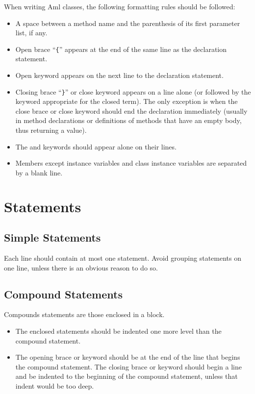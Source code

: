 When writing Aml classes, the following formatting rules should be followed: 
\begin{itemize}
  \item A space between a method name and the parenthesis of its first parameter list, if any. 
  \item Open brace ``\lstinline!{!'' appears at the end of the same line as the declaration statement. 
  \item Open keyword  appears on the next line to the declaration statement. 
  \item Closing brace ``\lstinline!}!'' or close keyword  appears on a line alone (or followed by the keyword appropriate for the closed term). The only exception is when the close brace or close keyword should end the declaration immediately (usually in method declarations or definitions of methods that have an empty body, thus returning a  value). 
  \item The  and  keywords should appear alone on their lines. 
  \item Members except instance variables and class instance variables are separated by a blank line. 
\end{itemize}





\section{Statements}






\subsection{Simple Statements}

Each line should contain at most one statement. Avoid grouping statements on one line, unless there is an obvious reason to do so. 





\subsection{Compound Statements}

Compounds statements are those enclosed in a block. 
\begin{itemize}
\item The enclosed statements should be indented one more level than the compound statement. 
\item The opening brace or keyword should be at the end of the line that begins the compound statement. The closing brace or keyword should begin a line and be indented to the beginning of the compound statement, unless that indent would be too deep. 
\end{itemize}





